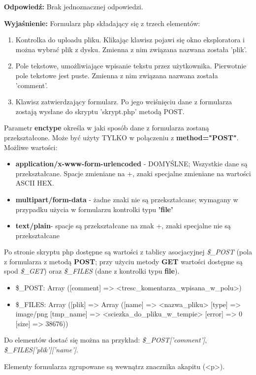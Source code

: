 \vspace{0.4cm}
\noindent
\textbf{Odpowiedź:}
Brak jednoznacznej odpowiedzi.

\vspace{0.4cm}
\noindent
\textbf{Wyjaśnienie:}
Formularz php składający się z trzech elementów:
\begin{enumerate}
\item
Kontrolka do uploadu pliku. Klikając klawisz pojawi się okno eksploratora i można wybrać plik z dysku. Zmienna z nim związana nazwana została 'plik'.
\item
Pole tekstowe, umożliwiające wpisanie tekstu przez użytkownika. Pierwotnie pole tekstowe jest puste. Zmienna z nim związana nazwana została 'comment'.
\item
Klawisz zatwierdzający formularz. Po jego wciśnięciu dane z formularza zostają wysłane do skryptu 'skrypt.php' metodą POST.
\end{enumerate}

Parametr \textbf{enctype} określa w jaki sposób dane z formularza zostaną przekształcone. Może być użyty TYLKO w połączeniu z \textbf{method="POST"}.
	Możliwe wartości:
\begin{itemize}
\item
\textbf{application/x-www-form-urlencoded} - DOMYŚLNE; Wszystkie dane są przekształcane. Spacje zmieniane na +, znaki specjalne zmieniane na wartości ASCII HEX.
\item
\textbf{multipart/form-data} - żadne znaki nie są przekształcane; wymagany w przypadku użycia w formularzu kontrolki typu \textbf{'file'}
\item
\textbf{text/plain}- spacje są przekształcane na znak +, znaki specjalne nie są przekształcane
\end{itemize}

Po stronie skryptu php dostępne są wartości z tablicy asocjacyjnej \textit{\$\_POST} (pola z formularza z metodą \textbf{POST}; przy użyciu metody \textbf{GET} wartości dostępne są spod \textit{\$\_GET}) oraz \textit{\$\_FILES} (dane z kontrolki typu \textbf{file}).

\begin{itemize}
\item
\$\_POST: Array ([comment] => <tresc\_komentarza\_wpisana\_w\_polu>)
\item
\$\_FILES: Array ([plik] => Array ([name] => <nazwa\_pliku> [type] => image/png [tmp\_name] => <sciezka\_do\_pliku\_w\_tempie> [error] => 0 [size] => 38676))
\end{itemize}
Do elementów dostać się można na przykład: \textit{\$\_POST['comment']}, \textit{\$\_FILES['plik']['name']}.

Elementy formularza zgrupowane są wewnątrz znacznika akapitu (<p>).
